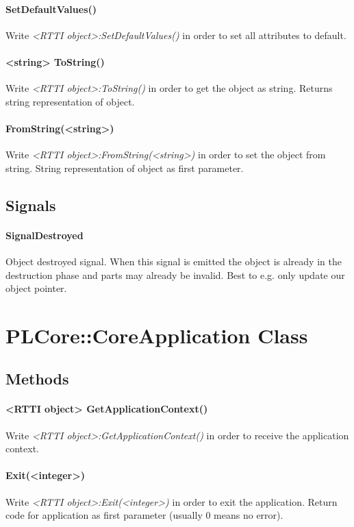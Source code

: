 \paragraph{SetDefaultValues()}
Write \emph{<RTTI object>:SetDefaultValues()} in order to set all attributes to default.

\paragraph{<string> ToString()}
Write \emph{<RTTI object>:ToString()} in order to get the object as string. Returns string representation of object.

\paragraph{FromString(<string>)}
Write \emph{<RTTI object>:FromString(<string>)} in order to set the object from string. String representation of object as first parameter.


\subsection{Signals}

\paragraph{SignalDestroyed}
Object destroyed signal. When this signal is emitted the object is already in the destruction phase and parts may already be invalid. Best to e.g. only update our object pointer.




\section{PLCore::CoreApplication Class}


\subsection{Methods}

\paragraph{<RTTI object> GetApplicationContext()}
Write \emph{<RTTI object>:GetApplicationContext()} in order to receive the application context.

\paragraph{Exit(<integer>)}
Write \emph{<RTTI object>:Exit(<integer>)} in order to exit the application. Return code for application as first parameter (usually 0 means no error).




